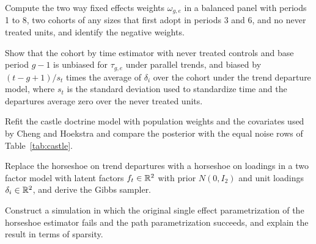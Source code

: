 \begin{exercises}
\item\label{ex:chdid:1} Compute the two way fixed effects weights $\omega_{g,e}$ in a balanced panel with periods 1 to 8, two cohorts of any sizes that first adopt in periods 3 and 6, and no never treated units, and identify the negative weights.
\item\label{ex:chdid:2} Show that the cohort by time estimator with never treated controls and base period $g - 1$ is unbiased for $\tau_{g,e}$ under parallel trends, and biased by $(t - g + 1)/s_t$ times the average of $\delta_i$ over the cohort under the trend departure model, where $s_t$ is the standard deviation used to standardize time and the departures average zero over the never treated units.
\item\label{ex:chdid:3} Refit the castle doctrine model with population weights and the covariates used by Cheng and Hoekstra and compare the posterior with the equal noise rows of Table~\ref{tab:castle}.
\item\label{ex:chdid:4} Replace the horseshoe on trend departures with a horseshoe on loadings in a two factor model with latent factors $f_t \in \mathbb{R}^2$ with prior $N(0, I_2)$ and unit loadings $\delta_i \in \mathbb{R}^2$, and derive the Gibbs sampler.
\item\label{ex:chdid:5} Construct a simulation in which the original single effect parametrization of the horseshoe estimator fails and the path parametrization succeeds, and explain the result in terms of sparsity.
\end{exercises}
